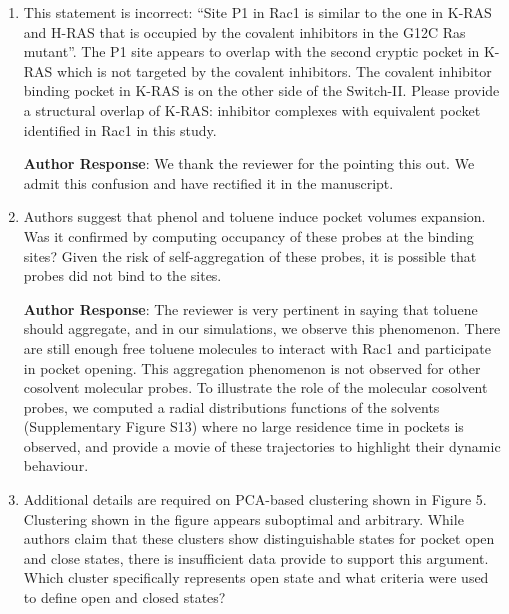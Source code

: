 \documentclass[11pt, a4paper]{article}
\begin{document}
\begin{enumerate}
\textbf{Author Response}: We agree with the review, and have rephrases appropriately in the main text. Furthermore, we have included all-atom RMSF in Figure, which is more informative than the backbone RMSF. We believe that oftentimes, pocket opening can observed as a result side-chain rotations with minimal moment in the backbone. 

    \item This statement is incorrect: “Site P1 in Rac1 is similar to the one in K-RAS and H-RAS that is occupied by the covalent inhibitors in the G12C Ras mutant”. The P1 site appears to overlap with the second cryptic pocket in K-RAS which is not targeted by the covalent inhibitors. The covalent inhibitor binding pocket in K-RAS is on the other side of the Switch-II. Please provide a structural overlap of K-RAS: inhibitor complexes with equivalent pocket identified in Rac1 in this study.

\textbf{Author Response}: We thank the reviewer for the pointing this out. We admit this confusion and have rectified it in the manuscript.
    
    \item Authors suggest that phenol and toluene induce pocket volumes expansion. Was it confirmed by computing occupancy of these probes at the binding sites? Given the risk of self-aggregation of these probes, it is possible that probes did not bind to the sites.

\textbf{Author Response}: The reviewer is very pertinent in saying that toluene should aggregate, and in our simulations, we observe this phenomenon. There are still enough free toluene molecules to interact with Rac1 and participate in pocket opening. This aggregation phenomenon is not observed for other cosolvent molecular probes. To illustrate the role of the molecular cosolvent probes, we computed a radial distributions functions of the solvents (Supplementary Figure S13) where no large residence time in pockets is observed, and provide a movie of these trajectories to highlight their dynamic behaviour.

    \item Additional details are required on PCA-based clustering shown in Figure 5. Clustering shown in the figure appears suboptimal and arbitrary. While authors claim that these clusters show distinguishable states for pocket open and close states, there is insufficient data provide to support this argument. Which cluster specifically represents open state and what criteria were used to define open and closed states?


\end{enumerate}
\end{document}
